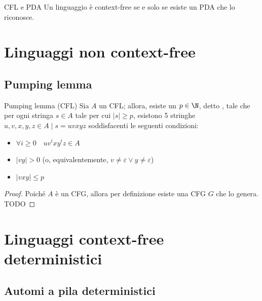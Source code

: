 \documentclass[a4paper, 12pt]{report}
\begin{document}
    \begin{framedthm}{CFL e PDA}
        Un linguaggio è context-free se e solo se esiste un PDA che lo riconosce.
    \end{framedthm}


    \section{Linguaggi non context-free}

    \subsection{Pumping lemma}

    \begin{framedlem}{Pumping lemma (CFL)}
        Sia $A$ un CFL; allora, esiste un $p \in \N$, detto , tale che per ogni stringa $s \in A$ tale per cui $|s| \ge p$, esistono 5 stringhe $u, v, x, y, z \in A \mid s = uvxyz$ soddisfacenti le seguenti condizioni:

        \begin{itemize}
            \item $\forall i \ge 0 \quad uv^ixy^iz \in A$
            \item $|vy| > 0$ (o, equivalentemente, $v \neq \varepsilon \lor y \neq \varepsilon$)
            \item $|vxy| \le p$
        \end{itemize}
    \end{framedlem}

    \begin{proof}
        Poiché $A$ è un CFG, allora per definizione esiste una CFG $G$ che lo genera. TODO
    \end{proof}
    
    \section{Linguaggi context-free deterministici}

    \subsection{Automi a pila deterministici}
\end{document}
